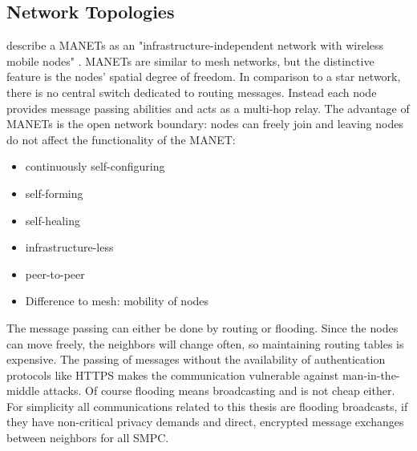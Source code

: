 	\subsection{Network Topologies}
	\label{Network Topologies}
	
	\textcite{Dorri2015} describe a \glspl{MANET} as an "infrastructure-independent network with wireless mobile nodes" \autocite[p. 15]{Dorri2015}. \glspl{MANET} are similar to mesh networks, but the distinctive feature is the nodes' spatial degree of freedom. In comparison to a star network, there is no central switch dedicated to routing messages. Instead each node provides message passing abilities and acts as a multi-hop relay.
	The advantage of \glspl{MANET} is the open network boundary: nodes can freely join and leaving nodes do not affect the functionality of the \gls{MANET}:
	
	\begin{itemize}  
		\item continuously self-configuring
		\item self-forming
		\item self-healing
		\item infrastructure-less
		\item peer-to-peer
		\item Difference to mesh: mobility of nodes
	\end{itemize}
			
	The message passing can either be done by routing or flooding. Since the nodes can move freely, the neighbors will change often, so maintaining routing tables is expensive. The passing of messages without the availability of authentication protocols like \gls{HTTPS} makes the communication vulnerable against man-in-the-middle attacks. Of course flooding means broadcasting and is not cheap either. For simplicity all communications related to this thesis are flooding broadcasts, if they have non-critical privacy demands and direct, encrypted message exchanges between neighbors for all \gls{SMPC}.
	
